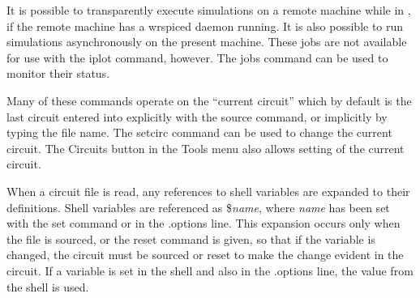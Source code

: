 It is possible to transparently execute simulations on a remote
machine while in {\WRspice}, if the remote machine has a {\vt
wrspiced} daemon running.  It is also possible to run simulations
asynchronously on the present machine.  These jobs are not available
for use with the {\cb iplot} command, however.  The {\cb jobs} command
can be used to monitor their status.

Many of these commands operate on the ``current circuit'' which by
default is the last circuit entered into {\WRspice} explicitly with
the {\cb source} command, or implicitly by typing the file name.  The
{\cb setcirc} command can be used to change the current circuit.  The
{\cb Circuits} button in the {\cb Tools} menu also allows setting of
the current circuit.

When a circuit file is read, any references to shell variables are
expanded to their definitions.  Shell variables are referenced as {\vt
\$}{\it name}, where {\it name} has been set with the {\cb set}
command or in the {\vt .options} line.  This expansion occurs only
when the file is sourced, or the {\cb reset} command is given, so that
if the variable is changed, the circuit must be sourced or reset to
make the change evident in the circuit.  If a variable is set in the
shell and also in the {\vt .options} line, the value from the shell
is used.

